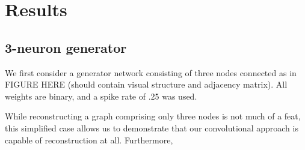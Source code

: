 
\chapter{Results}
\section{3-neuron generator}
We first consider a generator network consisting of three nodes connected as in 
FIGURE HERE (should contain visual structure and adjacency matrix). All weights 
are binary, and a spike rate of .25 was used.


While reconstructing a graph comprising only three nodes is not much of a feat, 
this simplified case allows us to demonstrate that our convolutional approach is 
capable of reconstruction at all. Furthermore, 
